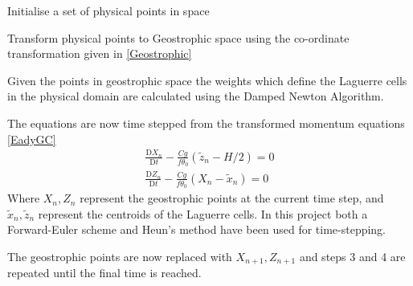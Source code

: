 \begin{description}
	\setlength{\parskip}{0pt}
	\setlength{\itemsep}{0pt}
	\item[Step 1] Initialise a set of physical points in space
	\item[Step 2] Transform physical points to Geostrophic space using the co-ordinate transformation given in \ref{Geostrophic}
	\item[Step 3] Given the points in geostrophic space the weights which define the Laguerre cells in the physical domain are calculated using the Damped Newton Algorithm.
	\item[Step 4] The equations are now time stepped from the transformed momentum equations \ref{EadyGC} 
	\begin{equation*}
		\begin{aligned}
			\frac{\mathrm{D}X_{n}}{\mathrm{D}t} -\frac{Cg}{f\theta _0}\left(\tilde{z}_n-H/2\right) = 0 \\
			\frac{\mathrm{D}Z_{n}}{\mathrm{D}t} - \frac{Cg}{f\theta_0}\left(X_n - \tilde{x}_n\right) = 0
		\end{aligned}
	\end{equation*}
	Where $X_n, Z_n$ represent the geostrophic points at the current time step, and $\tilde{x}_n,\tilde{z}_n$ represent the centroids of the Laguerre cells. In this project both a Forward-Euler scheme and Heun's method have been used for time-stepping.
	\item[Step 5] The geostrophic points are now replaced with $X_{n+1}, Z_{n+1}$ and steps 3 and 4 are repeated until the final time is reached.
\end{description}
